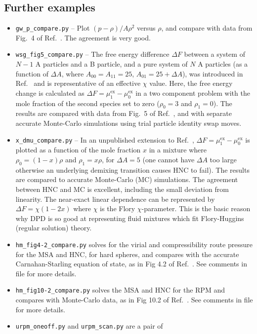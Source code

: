 \documentclass[12pt,a4paper]{article}
\newcommand{\myex}{^{\mathrm{ex}}}
\newcommand{\muex}{\mu\myex}
\newcommand{\Refcite}[1]{Ref.~\cite{#1}}
\begin{document}
\subsection{Further examples}

\begin{itemize}
%
\item\verb+gw_p_compare.py+ -- Plot $(p-\rho) /A\rho^2$ versus $\rho$,
  and compare with data from Fig.~4 of \Refcite{GW97}.  The agreement
  is very good.
%
\item\verb+wsg_fig5_compare.py+ -- The free energy difference $\Delta
  F$ between a system of $N-1$ A particles and a B particle, and a
  pure system of $N$ A particles (as a function of $\Delta A$, where
  $A_{00}=A_{11}=25$, $A_{01}=25+\Delta A$), was introduced in
  \Refcite{WSG01} and is representative of an effective $\chi$ value.
  Here, the free energy change is calculated as $\Delta
  F=\muex_1-\muex_0$ in a two component problem with the mole fraction
  of the second species set to zero ($\rho_0=3$ and $\rho_1=0$).  The
  results are compared with data from Fig.~5 of \Refcite{WSG01}, and
  with separate accurate Monte-Carlo simulations using trial particle
  identity swap moves. 
%
\item\verb+x_dmu_compare.py+ -- In an unpublished extension to
  \Refcite{WSG01}, $\Delta F=\muex_1-\muex_0$ is plotted as a function
  of the mole fraction $x$ in a mixture where $\rho_0=(1-x)\rho$ and
  $\rho_1=x\rho$, for $\Delta A=5$ (one cannot have $\Delta A$ too
  large otherwise an underlying demixing transition causes HNC to
  fail).  The results are compared to accurate Monte-Carlo (MC)
  simulations.  The agreement between HNC and MC is excellent,
  including the small deviation from linearity.  The near-exact linear
  dependence can be represented by $\Delta F = \chi (1 - 2x)$ where
  $\chi$ is the Flory $\chi$-parameter.  This is the basic reason why
  DPD is so good at representing fluid mixtures which fit
  Flory-Huggins (regular solution) theory.
%
\item\verb+hm_fig4-2_compare.py+ solves for the virial and
  compressibility route pressure for the MSA and HNC, for hard
  spheres, and compares with the accurate Carnahan-Starling equation of
  state, as in Fig 4.2 of \Refcite{HM06}.  See comments in file for
  more details.
%
\item\verb+hm_fig10-2_compare.py+ solves the MSA and HNC for the
  RPM and compares with Monte-Carlo data, as in Fig 10.2 of
  \Refcite{HM06}.  See comments in file for more details.
%
\item\verb+urpm_oneoff.py+ and \verb+urpm_scan.py+ are a pair of

\end{itemize}
\end{document}
